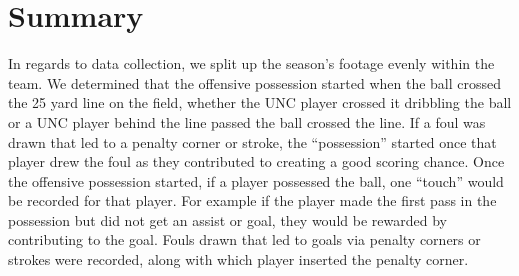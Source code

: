 \documentclass{article} %
\begin{document}
\begin{table}[!ht]
	\centering
	\caption{First 7 Data Entries}
\end{table}
\FloatBarrier
\section{Summary}


In regards to data collection, we split up the season’s footage evenly within the team. We determined that the offensive possession started when the ball crossed the 25 yard line on the field, whether the UNC player crossed it dribbling the ball or a UNC player behind the line passed the ball crossed the line. If a foul was drawn that led to a penalty corner or stroke, the “possession” started once that player drew the foul as they contributed to creating a good scoring chance. Once the offensive possession started, if a player possessed the ball, one “touch” would be recorded for that player. For example if the player made the first pass in the possession but did not get an assist or goal, they would be rewarded by contributing to the goal. Fouls drawn that led to goals via penalty corners or strokes were recorded, along with which player inserted the penalty corner. 
\end{document}
